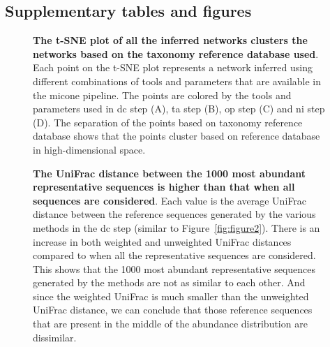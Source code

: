   \FloatBarrier
  \newpage
  \subsection*{Supplementary tables and figures}

  \renewcommand{\thefigure}{S\arabic{figure}}
  \setcounter{figure}{0}

  \renewcommand{\thetable}{S\arabic{table}}
  \setcounter{table}{0}


    \begin{figure}[H]
      \centering
        \caption{
          \textbf{The t-SNE plot of all the inferred networks clusters the networks based on the taxonomy reference database used}.
          Each point on the t-SNE plot represents a network inferred using different combinations of tools and parameters that are available in the \ac{micone} pipeline.
          The points are colored by the tools and parameters used in \ac{dc} step (A), \ac{ta} step (B), \ac{op} step (C) and \ac{ni} step (D).
          The separation of the points based on taxonomy reference database shows that the points cluster based on reference database in high-dimensional space.
        }
      \label{fig:figure_s1}
    \end{figure}

    \begin{figure}[H]
      \centering
        \caption{
          \textbf{The UniFrac distance between the 1000 most abundant representative sequences is higher than that when all sequences are considered}.
          Each value is the average UniFrac distance between the reference sequences generated by the various methods in the \ac{dc} step (similar to Figure~\ref{fig:figure2}).
          There is an increase in both weighted and unweighted UniFrac distances compared to when all the representative sequences are considered.
          This shows that the 1000 most abundant representative sequences generated by the methods are not as similar to each other.
          And since the weighted UniFrac is much smaller than the unweighted UniFrac distance, we can conclude that those reference sequences that are present in the middle of the abundance distribution are dissimilar.
        }
      \label{fig:figure_s2}
    \end{figure}

